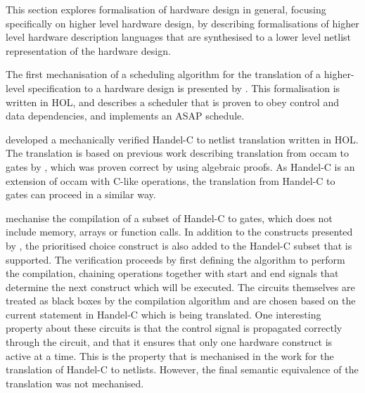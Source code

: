 This section explores formalisation of hardware design in general, focusing
specifically on higher level hardware design, by describing formalisations of
higher level hardware description languages that are synthesised to a lower
level netlist representation of the hardware design.

The first mechanisation of a scheduling algorithm for the translation of a
higher-level specification to a hardware design is presented by
\cite{anderson94_vsa}.  This formalisation is written in HOL, and describes a
scheduler that is proven to obey control and data dependencies, and implements
an ASAP schedule.

\textcite{perna12_mechan_wire_wise_verif_handel_c_synth} developed a
mechanically verified Handel-C to netlist translation written in HOL.  The
translation is based on previous work describing translation from occam to gates
by \textcite{page91_compil_occam}, which was proven correct by
\textcite{jifeng93_towar} using algebraic proofs.  As Handel-C is an extension
of occam with C-like operations, the translation from Handel-C to gates can
proceed in a similar way.

\citeauthor{perna12_mechan_wire_wise_verif_handel_c_synth} mechanise the
compilation of a subset of Handel-C to gates, which does not include memory,
arrays or function calls.  In addition to the constructs presented by
\citeauthor{page91_compil_occam}, the prioritised choice construct is also added
to the Handel-C subset that is supported.  The verification proceeds by first
defining the algorithm to perform the compilation, chaining operations together
with start and end signals that determine the next construct which will be
executed.  The circuits themselves are treated as black boxes by the compilation
algorithm and are chosen based on the current statement in Handel-C which is
being translated.  One interesting property about these circuits is that the
control signal is propagated correctly through the circuit, and that it ensures
that only one hardware construct is active at a time.  This is the property that
is mechanised in the work for the translation of Handel-C to netlists.  However,
the final semantic equivalence of the translation was not mechanised.

